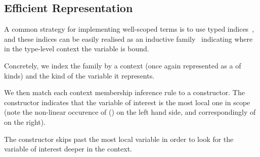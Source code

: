 \subsection{Efficient \DeBruijn{} Representation}
\label{sec:design:deBruijn}

A common strategy for implementing well-scoped terms is to use typed
\emph{\DeBruijn{}} indices~\cite{MANUAL:journals/math/debruijn72}, and these indices can be easily realised as an inductive family~\cite{DBLP:journals/fac/Dybjer94}
indicating where in the type-level context the variable is bound.

Concretely, we index the  family by a context
(once again represented as a  of kinds) and
the kind of the variable it represents.

\begin{center}
\begin{minipage}{0.10\textwidth}
\varRule
\end{minipage}\hfill
\begin{minipage}{0.80\textwidth}
\end{minipage}
\end{center}

We then match each context membership inference rule to a constructor.
%
The  constructor indicates that the variable of interest is
the most local one in scope (note the non-linear occurence of () on
the left hand side, and correspondingly of  on the right).

\begin{center}
\begin{minipage}{0.35\textwidth}
  \varZero
\end{minipage}\hfill
\begin{minipage}{0.55\textwidth}
\end{minipage}
\end{center}

The  constructor skips past the most local variable in order
to look for the variable of interest deeper in the context.

\begin{center}
\begin{minipage}{0.35\textwidth}
  \varSuc
\end{minipage}\hfill
\begin{minipage}{0.55\textwidth}
\end{minipage}
\end{center}


